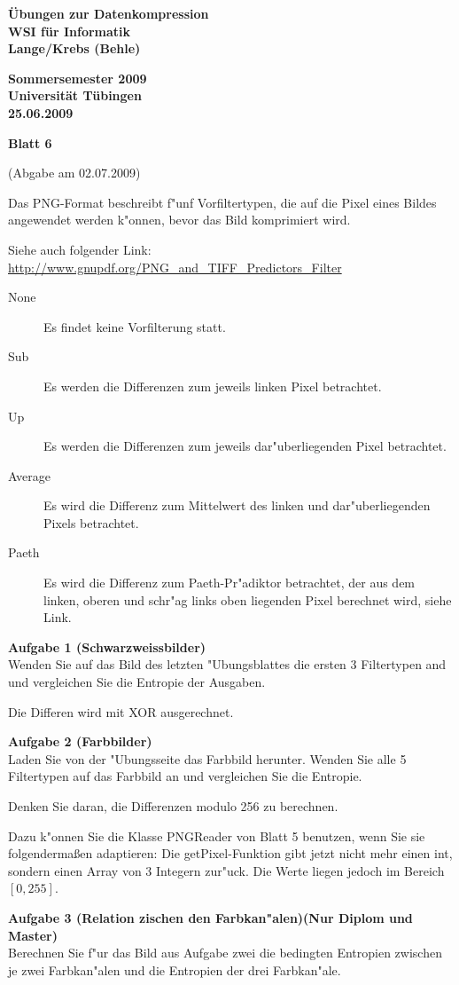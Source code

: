 \documentclass[a4paper]{article}
\def\header#1#2#3#4{\pagestyle{empty}
\noindent
\begin{minipage}[t]{0.6\textwidth}
\begin{flushleft}
\bf \"Ubungen zur Datenkompression\\
WSI f\"ur Informatik\\
Lange/Krebs (Behle)
\end{flushleft}
\end{minipage}
\begin{minipage}[t]{0.4\textwidth}
\begin{flushright}
\bf Sommersemester 2009\\
Universit\"at T\"ubingen\\
#2 %
\end{flushright}
\end{minipage}

\begin{center}
{\Large\bf Blatt #1}

{(Abgabe am #3)}
\end{center}
}
\begin{document}
\header{6}{25.06.2009}{02.07.2009}{}

\bigskip

\noindent
Das PNG-Format beschreibt f"unf Vorfiltertypen, die auf die Pixel eines Bildes angewendet werden k"onnen, bevor das Bild komprimiert wird.

Siehe auch folgender Link: \url{http://www.gnupdf.org/PNG_and_TIFF_Predictors_Filter}
\begin{description}
\item[None] Es findet keine Vorfilterung statt.
\item[Sub] Es werden die Differenzen zum jeweils linken Pixel betrachtet.
\item[Up]  Es werden die Differenzen zum jeweils dar"uberliegenden Pixel betrachtet.
\item[Average] Es wird die Differenz zum Mittelwert des linken und dar"uberliegenden Pixels betrachtet.
\item[Paeth] Es wird die Differenz zum Paeth-Pr"adiktor betrachtet, der aus dem linken, oberen und schr"ag links oben liegenden Pixel berechnet wird, siehe Link.
\end{description}


\bigskip


{\bf Aufgabe 1  \quad(Schwarzweissbilder)}\\
Wenden Sie auf das Bild des letzten "Ubungsblattes die ersten 3 Filtertypen and und vergleichen Sie die Entropie der Ausgaben.

Die Differen wird mit XOR ausgerechnet.


\bigskip


{\bf Aufgabe 2  \quad(Farbbilder)}\\
Laden Sie von der "Ubungsseite das Farbbild herunter.
Wenden Sie alle 5 Filtertypen auf das Farbbild an und vergleichen Sie die Entropie. 

Denken Sie daran, die Differenzen modulo 256 zu berechnen.

Dazu k"onnen Sie die Klasse {\rm PNGReader} von Blatt 5 benutzen, wenn Sie sie folgenderma{\ss}en adaptieren:
Die {\rm getPixel}-Funktion gibt jetzt nicht mehr einen {\rm int}, sondern einen Array von 3 Integern zur"uck.
Die Werte liegen jedoch im Bereich $[0,255]$. 


\bigskip


{\bf Aufgabe 3  \quad(Relation zischen den Farbkan"alen)\quad (Nur Diplom und Master)}\\
Berechnen Sie f"ur das Bild aus Aufgabe zwei die bedingten Entropien zwischen je zwei Farbkan"alen und die Entropien der drei Farbkan"ale.
\end{document}
